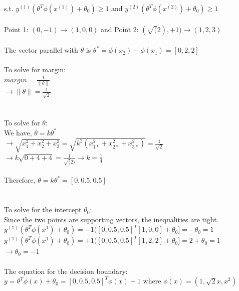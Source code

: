 \documentclass[12pt]{article}
\begin{document}
s.t. $y^{(1)}(\theta^T\phi(x^{(1)}) + \theta_0) \geq 1$ and $y^{(2)}(\theta^T\phi(x^{(2)}) + \theta_0) \geq 1$\\
\\
Point 1: $(0,-1) \rightarrow (1,0,0)$ and Point 2: $(\sqrt(2), +1) \rightarrow (1,2,3)$ \\
\\
The vector parallel with $\theta$ is $\theta^* = \phi(x_2) - \phi(x_1) = [0, 2, 2]$\\
\\
To solve for margin:\\
$margin = \frac{1}{\|\theta\|} $\\
$\rightarrow \|\theta\| = \frac{1}{\sqrt {2}}$\\
\\
\\To solve for $\theta$:\\
We have, $\theta = k \theta^*$\\
$\rightarrow \sqrt{x_1^2 + x_2^2 + x_3^2} = \sqrt {k^2 (x_{1*}^2 + x_{2*}^2 +x_{3*}^2)} =  \frac{1}{\sqrt{2}}$\\
$\rightarrow k\sqrt{0 + 4 + 4} = \frac{1}{\sqrt(2)} \rightarrow k =  \frac{1}{4}$ \\
\\
Therefore, $\theta = k\theta^* = [0, 0.5, 0.5]$ \\
\\
\\ 
To solve for the intercept $\theta_0$:\\
Since the two points are supporting vectors, the inequalities are tight.\\
$y^{(1)}(\theta^T\phi(x^1) + \theta_0) = -1([0,0.5, 0.5]^T [1,0,0] + \theta_0] = -\theta_0 = 1 $ \\
$y^{(1)}(\theta^T\phi(x^1) + \theta_0) = +1([0,0.5, 0.5]^T [1,2,2] + \theta_0] = 2+ \theta_0 = 1 $ \\
$\rightarrow \theta_0 = -1 $\\
\\
The equation for the decision boundary:\\
$y = \theta^T\phi(x) + \theta_0 = [0, 0.5, 0.5]^T \phi(x) - 1$ where $\phi(x) = (1, \sqrt{2}x, x^2)$\\
\end{document}
